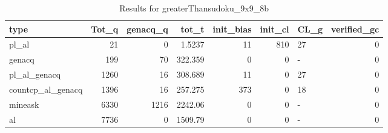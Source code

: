 \begin{table}[ht]
\caption{Results for greaterThansudoku_9x9_8b}
\begin{tabular}{lrrrrrlr}
\hline
 type              &   Tot\_q &   genacq\_q &     tot\_t &   init\_bias &   init\_cl & CL\_g   &   verified\_gc \\
\hline
 pl\_al             &      21 &          0 &    1.5237 &          11 &       810 & 27     &             0 \\
 genacq            &     199 &         70 &  322.359  &           0 &         0 & -      &             0 \\
 pl\_al\_genacq      &    1260 &         16 &  308.689  &          11 &         0 & 27     &             0 \\
 countcp\_al\_genacq &    1396 &         16 &  257.275  &         373 &         0 & 18     &             0 \\
 mineask           &    6330 &       1216 & 2242.06   &           0 &         0 & -      &             0 \\
 al                &    7736 &          0 & 1509.79   &           0 &         0 & -      &             0 \\
\hline
\end{tabular}
\end{table}